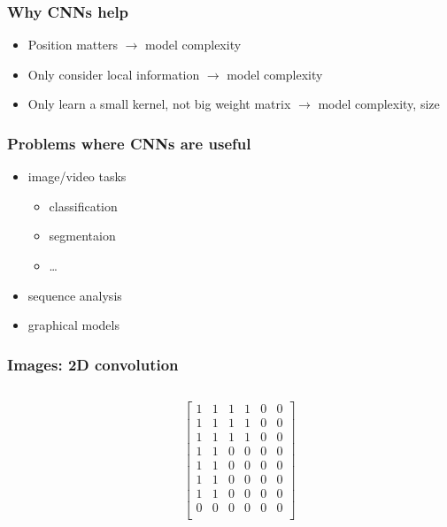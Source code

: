 \documentclass[aspectratio=169,14pt]{beamer}
\begin{document}
\begin{frame}
    \frametitle{Why CNNs help}
\begin{itemize}
    \item Position matters $\rightarrow$ model complexity
    \item Only consider local information $\rightarrow$ model complexity
    \item Only learn a small kernel, not big weight matrix $\rightarrow$ model complexity, size
\end{itemize}
\end{frame}


\begin{frame}
\frametitle{Problems where CNNs are useful}
\begin{itemize}
    \item image/video tasks
    \begin{itemize}
        \item classification
        \item segmentaion
        \item \dots
    \end{itemize}
    \item sequence analysis
    \item graphical models
\end{itemize}
\end{frame}


\begin{frame}
    \frametitle{Images: 2D convolution}
\begin{columns}
    \begin{column}{0.5\textwidth}
        \begin{center}
\end{center}
\end{column}
\begin{column}{0.5\textwidth}
$\begin{bmatrix}
1 & 1 & 1 & 1 & 0 & 0 \\
1 & 1 & 1 & 1 & 0 & 0 \\
1 & 1 & 1 & 1 & 0 & 0 \\
1 & 1 & 0 & 0 & 0 & 0 \\
1 & 1 & 0 & 0 & 0 & 0 \\
1 & 1 & 0 & 0 & 0 & 0 \\
1 & 1 & 0 & 0 & 0 & 0 \\
0 & 0 & 0 & 0 & 0 & 0 \\
\end{bmatrix}$
\end{column}
\end{columns}
\end{frame}
\end{document}
